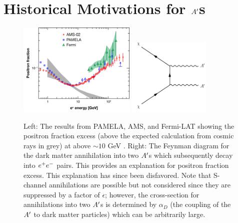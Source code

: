 






\clearpage

\section{Historical Motivations for $A^\prime$s} \label{sec:history}

\begin{figure}
    \centering
    \includegraphics[width=0.5\textwidth]{figs/motivation/pamela.png}
    \includegraphics[width=0.35\textwidth]{figs/motivation/dm_annihilation.png}
    \caption{Left: The results from PAMELA, AMS, and Fermi-LAT showing the positron fraction excess (above the expected calculation from cosmic rays in grey) at above $\sim 10$ GeV \cite{Coutu:2013}. Right: The Feynman diagram for the dark matter annihilation into two $A^\prime$s which subsequently decay into $e^{+}e^{-}$ pairs. This provides an explanation for positron fraction excess. This explanation has since been disfavored. Note that S-channel annihilations are possible but not considered since they are suppressed by a factor of $\epsilon$; however, the cross-section for annihilations into two $A^\prime$s is determined by $\alpha_{D}$ (the coupling of the $A^\prime$ to dark matter particles) which can be arbitrarily large. 
    }
    \label{fig:pamela}
\end{figure}

